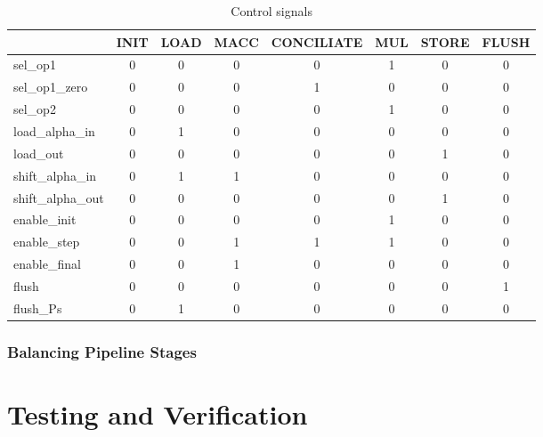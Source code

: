 \documentclass[mscthesis]{usiinfthesis}
\begin{document}
\begin{table}[H]
    \label{tab:ctrl}
    \begin{center}
    \begin{tabular}{|l|c|c|c|c|c|c|c|}
    \hline
                      & INIT & LOAD & MACC & CONCILIATE & MUL & STORE & FLUSH \\
    \hline
    sel\_op1          & 0    & 0    & 0    & 0          & 1   & 0     & 0     \\
    sel\_op1\_zero    & 0    & 0    & 0    & 1          & 0   & 0     & 0     \\
    sel\_op2          & 0    & 0    & 0    & 0          & 1   & 0     & 0     \\
    load\_alpha\_in   & 0    & 1    & 0    & 0          & 0   & 0     & 0     \\
    load\_out         & 0    & 0    & 0    & 0          & 0   & 1     & 0     \\
    shift\_alpha\_in  & 0    & 1    & 1    & 0          & 0   & 0     & 0     \\
    shift\_alpha\_out & 0    & 0    & 0    & 0          & 0   & 1     & 0     \\
    enable\_init      & 0    & 0    & 0    & 0          & 1   & 0     & 0     \\
    enable\_step      & 0    & 0    & 1    & 1          & 1   & 0     & 0     \\
    enable\_final     & 0    & 0    & 1    & 0          & 0   & 0     & 0     \\
    flush             & 0    & 0    & 0    & 0          & 0   & 0     & 1     \\
    flush\_Ps         & 0    & 1    & 0    & 0          & 0   & 0     & 0     \\
    \hline
    \end{tabular}
    \end{center}
    \caption{Control signals}
\end{table}

\subsection{Balancing Pipeline Stages}

\chapter{Testing and Verification}
\label{ch:test}
\end{document}
